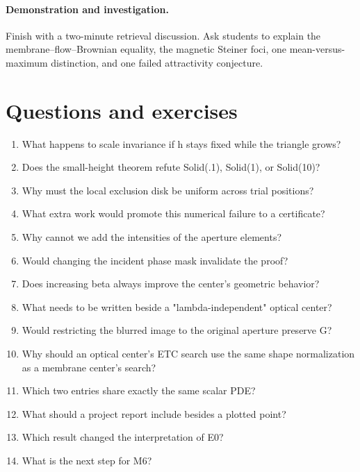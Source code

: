 \documentclass[11pt,oneside,openany]{book}
\begin{document}
\paragraph{Demonstration and investigation.} Finish with a two-minute retrieval discussion. Ask students to explain the membrane--flow--Brownian equality, the magnetic Steiner foci, one mean-versus-maximum distinction, and one failed attractivity conjecture.


\section*{Questions and exercises}

\begin{enumerate}

\item\label{ex:77} What happens to scale invariance if h stays fixed while the triangle grows?

\item\label{ex:78} Does the small-height theorem refute Solid(.1), Solid(1), or Solid(10)?

\item\label{ex:79} Why must the local exclusion disk be uniform across trial positions?

\item\label{ex:80} What extra work would promote this numerical failure to a certificate?

\item\label{ex:81} Why cannot we add the intensities of the aperture elements?

\item\label{ex:82} Would changing the incident phase mask invalidate the proof?

\item\label{ex:83} Does increasing beta always improve the center's geometric behavior?

\item\label{ex:84} What needs to be written beside a "lambda-independent" optical center?

\item\label{ex:85} Would restricting the blurred image to the original aperture preserve G?

\item\label{ex:86} Why should an optical center's ETC search use the same shape normalization as a membrane center's search?

\item\label{ex:87} Which two entries share exactly the same scalar PDE?

\item\label{ex:88} What should a project report include besides a plotted point?

\item\label{ex:89} Which result changed the interpretation of E0?

\item\label{ex:90} What is the next step for M6?

\end{enumerate}
\end{document}

